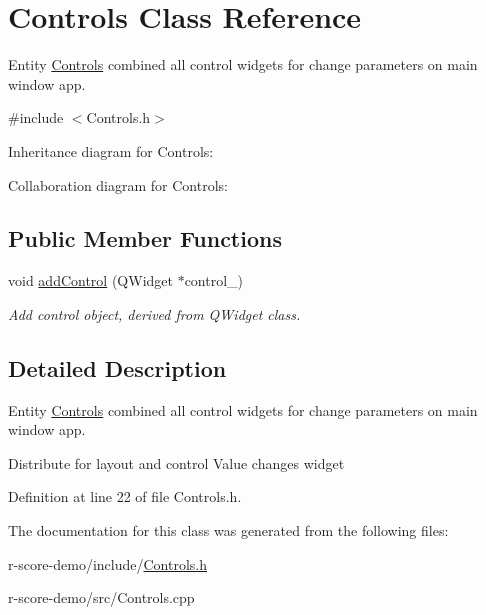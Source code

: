 \hypertarget{class_controls}{}\section{Controls Class Reference}
\label{class_controls}


Entity \mbox{\hyperlink{class_controls}{Controls}} combined all control widgets for change parameters on main window app.  




{\ttfamily \#include $<$Controls.\+h$>$}



Inheritance diagram for Controls\+:


Collaboration diagram for Controls\+:
\subsection*{Public Member Functions}
\begin{DoxyCompactItemize}
\item 
\mbox{\label{class_controls_a59b07fad8a3f96a814601dd4132fc2f5}} 
void \mbox{\hyperlink{class_controls_a59b07fad8a3f96a814601dd4132fc2f5}{add\+Control}} (Q\+Widget $\ast$control\+\_\+)
\begin{DoxyCompactList}\small\item\em Add control object, derived from Q\+Widget class. \end{DoxyCompactList}\end{DoxyCompactItemize}


\subsection{Detailed Description}
Entity \mbox{\hyperlink{class_controls}{Controls}} combined all control widgets for change parameters on main window app. 

Distribute for layout and control Value changes widget 

Definition at line 22 of file Controls.\+h.



The documentation for this class was generated from the following files\+:\begin{DoxyCompactItemize}
\item 
r-\/score-\/demo/include/\mbox{\hyperlink{_controls_8h}{Controls.\+h}}\item 
r-\/score-\/demo/src/Controls.\+cpp\end{DoxyCompactItemize}
